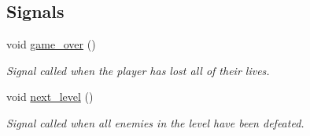 \subsection*{Signals}
\begin{DoxyCompactItemize}
\item 
void \hyperlink{classlevel2_a688ffd62097bfe0e62e16c34f4b0c0fb}{game\+\_\+over} ()\hypertarget{classlevel2_a688ffd62097bfe0e62e16c34f4b0c0fb}{}\label{classlevel2_a688ffd62097bfe0e62e16c34f4b0c0fb}

\begin{DoxyCompactList}\small\item\em Signal called when the player has lost all of their lives. \end{DoxyCompactList}\item 
void \hyperlink{classlevel2_ab9639c124108ea3170de5051f9016151}{next\+\_\+level} ()\hypertarget{classlevel2_ab9639c124108ea3170de5051f9016151}{}\label{classlevel2_ab9639c124108ea3170de5051f9016151}

\begin{DoxyCompactList}\small\item\em Signal called when all enemies in the level have been defeated. \end{DoxyCompactList}\end{DoxyCompactItemize}
